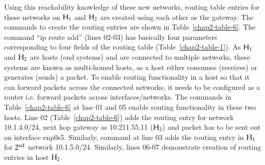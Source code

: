 \begin{multicols}{2}
Using this reachability knowledge of these new networks, routing table entries for these networks on ${\rm H}_{1}$ and ${\rm H}_{2}$ are created using each other as the gateway. The commands to create the routing entries are shown in Table~\ref{chap2-table-6}. The command “ip route add” (lines 02-03) has basically four parameters corresponding to four fields of the routing table (Table~\ref{chap2-table-1}). As ${\rm H}_{1}$ and ${\rm H}_{2}$ are hosts (end systems) and are connected to multiple networks, these systems are known as multi-homed hosts, as a host either consumes (receives) or generates (sends) a packet. To enable routing functionality in a host so that it can forward packets across the connected networks, it needs to be configured as a router i.e. forward packets across interfaces/networks. The commands in Table~\ref{chap2-table-6} at line 01 and 05 enable routing functionality in these two hosts. Line 02 (Table~\ref{chap2-table-6}) adds the routing entry for network 10.1.4.0/24, next hop gateway as 10.211.55.11 (${\rm H}_{2}$) and packet has to be sent out on interface enp0s5. Similarly, command at line 03 adds the routing entry in ${\rm H}_{1}$ for $2^{\rm nd}$ network 10.1.5.0/24. Similarly, lines 06-07 demonstrate creation of routing entries in host ${\rm H}_{2}$.
\end{multicols}

\vspace{-.6cm}

